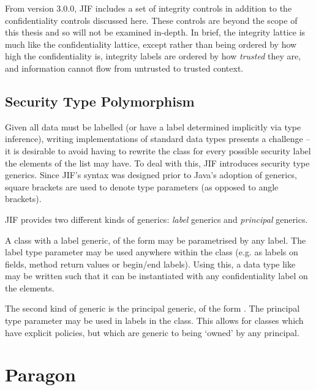 From version 3.0.0, JIF includes a set of integrity controls in addition to the confidentiality controls discussed here. These controls are beyond the scope of this thesis and so will not be examined in-depth. In brief, the integrity lattice is much like the confidentiality lattice, except rather than being ordered by how high the confidentiality is, integrity labels are ordered by how \textit{trusted} they are, and information cannot flow from untrusted to trusted context.

\subsection{Security Type Polymorphism}

Given all data must be labelled (or have a label determined implicitly via type inference), writing implementations of standard data types presents a challenge -- it is desirable to avoid having to rewrite the  class for every possible security label the elements of the list may have. To deal with this, JIF introduces security type generics. Since JIF's syntax was designed prior to Java's adoption of generics, square brackets are used to denote type parameters (as opposed to angle brackets).

JIF provides two different kinds of generics: \textit{label} generics and \textit{principal} generics.

A class with a label generic, of the form  may be parametrised by any label. The label type parameter may be used anywhere within the class (e.g. as labels on fields, method return values or begin/end labels). Using this, a data type like  may be written such that it can be instantiated with any confidentiality label on the elements.

The second kind of generic is the principal generic, of the form . The principal type parameter may be used in labels in the class. This allows for classes which have explicit policies, but which are generic to being `owned' by any principal.


\section{Paragon}


